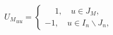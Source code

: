 \begin{equation}
\label{U}
{U_M}_{uu}=
\begin{cases}
        \phantom{-}1,\quad u\in J_M,\\
        -1,\quad u\in I_n\backslash J_n,
\end{cases}
\end{equation}

